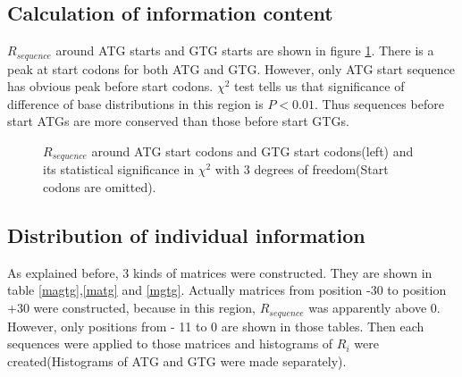\subsection{Calculation of information content}

\(R_{sequence}\) around ATG starts and GTG starts are shown in figure 
\ref{rentro}. There is a peak at start codons for both ATG and GTG.
However, only ATG start sequence has obvious peak before start codons.
\(\chi^{2}\) test tells us that significance of difference of base
distributions in this region is \(P < 0.01\).
Thus sequences before start ATGs are more conserved than those before
start GTGs.

\begin{figure}
\begin{center}
\end{center}
\caption{\(R_{sequence}\) around ATG start codons and GTG start
codons(left) and its statistical significance in \(\chi^{2}\) with 3
degrees of freedom(Start codons are omitted).} 
\label{rentro}
\end{figure}


\subsection{Distribution of individual information}

As explained before, 3 kinds of matrices were constructed. They are
shown in table \ref{magtg},\ref{matg} and \ref{mgtg}. Actually
matrices from position -30 to position +30 were constructed, because
in this region, \(R_{sequence}\) was apparently above 0. However, only
positions from - 11 to 0 are shown in those tables. Then each
sequences were applied to those matrices and histograms of \(R_{i}\)
were created(Histograms of ATG and GTG were made separately).

